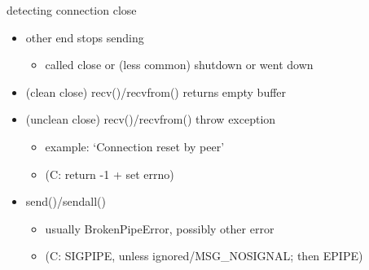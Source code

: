\begin{frame}{detecting connection close}
    \begin{itemize}
    \item other end stops sending
        \begin{itemize}
        \item called close or (less common) shutdown or went down
        \end{itemize}
    \item (clean close) recv()/recvfrom() returns empty buffer
    \item (unclean close) recv()/recvfrom() throw exception
        \begin{itemize}
        \item example: `Connection reset by peer'
        \item (C: return -1 + set errno)
        \end{itemize}
    \item send()/sendall()
        \begin{itemize}
        \item usually BrokenPipeError, possibly other error
        \item (C: SIGPIPE, unless ignored/MSG\_NOSIGNAL; then EPIPE)
        \end{itemize}
    \end{itemize}
\end{frame}
